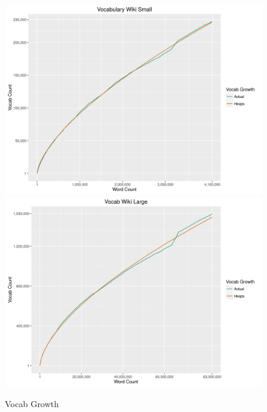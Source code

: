 \documentclass[11pt]{article}
\begin{document}
\begin{figure}[h]
\centering
\includegraphics[scale=0.6]{wikiSmallVG.png}
\includegraphics[scale=0.6]{wikiLargeVG.png}
\caption{Vocab Growth}
\label{fig:wvg}
\end{figure}
\end{document}
